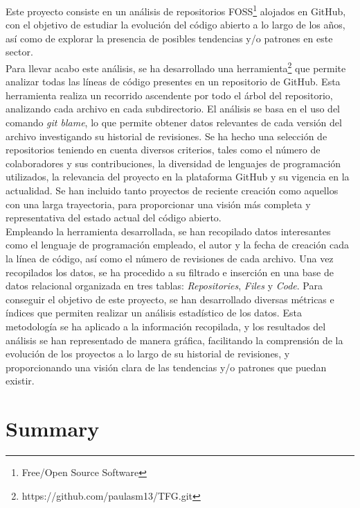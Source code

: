 \documentclass[a4paper, 12pt]{book}
\begin{document}
Este proyecto consiste en un análisis de repositorios FOSS\footnote{Free/Open Source Software} alojados en GitHub, con el
objetivo de estudiar la evolución del código abierto a lo largo de los años, así como de explorar la presencia de
posibles tendencias y/o patrones en este sector. 
\\Para llevar acabo este análisis, se ha desarrollado una herramienta\footnote{https://github.com/paulasm13/TFG.git} que permite analizar todas las líneas de código presentes
en un repositorio de GitHub. Esta herramienta realiza un recorrido ascendente por todo el árbol del repositorio, analizando cada
archivo en cada subdirectorio. El análisis se basa en el uso del comando \textit{git blame}, lo que permite obtener datos relevantes
de cada versión del archivo investigando su historial de revisiones. 
Se ha hecho una selección de repositorios teniendo en cuenta diversos criterios, tales como el número de colaboradores y sus
contribuciones, la diversidad de lenguajes de programación utilizados, la relevancia del proyecto en la plataforma GitHub y su 
vigencia en la actualidad. Se han incluido tanto proyectos de reciente creación como aquellos con una larga trayectoria, para
proporcionar una visión más completa y representativa del estado actual del código abierto. 
\\Empleando la herramienta desarrollada, se han recopilado datos interesantes como el lenguaje de programación empleado,
el autor y la fecha de creación cada la línea de código, así como el número de revisiones de cada archivo. Una vez recopilados los datos,
se ha procedido a su filtrado e inserción en una base de datos relacional organizada en tres tablas: \textit{Repositories}, \textit{Files}
y \textit{Code}. Para conseguir el objetivo de este proyecto, se han desarrollado diversas métricas e índices que permiten realizar un análisis
estadístico de los datos. Esta metodología se ha aplicado a la información recopilada, y los resultados del análisis se han representado de
manera gráfica, facilitando la comprensión de la evolución de los proyectos a lo largo de su historial de revisiones, y proporcionando una
visión clara de las tendencias y/o patrones que puedan existir.


\chapter*{Summary}
\end{document}
